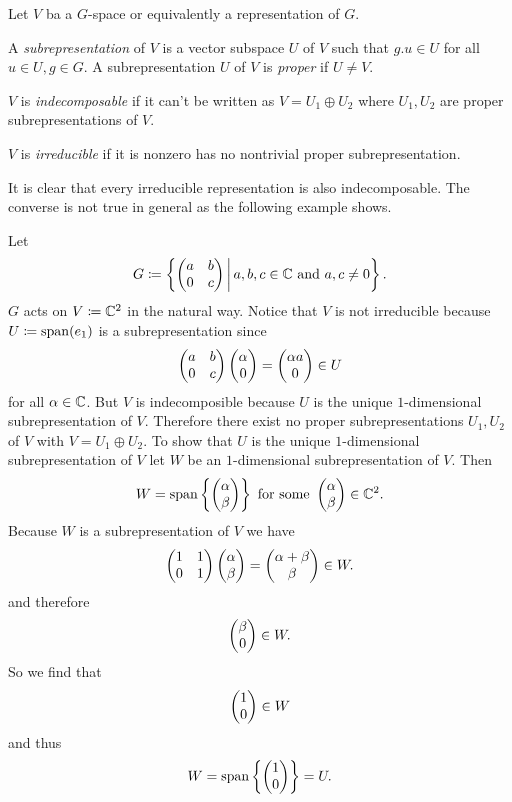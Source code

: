 \begin{defi}
    Let $V$ ba a $G$-space or equivalently a representation of $G$.

    A \emph{subrepresentation} of $V$ is a vector subspace $U$ of $V$ such that $g.u \in U$ for all $u \in U, g \in G$.
    A subrepresentation $U$ of $V$ is \emph{proper} if $U \neq V$.
    
    $V$ is \emph{indecomposable} if it can’t be written as $V = U_1 \oplus U_2$ where $U_1, U_2$ are proper subrepresentations of $V$.
    
    $V$ is \emph{irreducible} if it is nonzero has no nontrivial proper subrepresentation.
\end{defi}

It is clear that every irreducible representation is also indecomposable.
The converse is not true in general as the following example shows.

\begin{expl}
  Let
  \[
              G
    \coloneqq \left\{
                \begin{pmatrix}
                  a & b \\
                  0 & c
                \end{pmatrix}
              \,\middle|\,
                a, b, c \in \mathbb{C}
                \text{ and }
                a, c \neq 0
              \right\}.
  \]
  $G$ acts on $V \coloneqq \mathbb{C}^2$ in the natural way.
  Notice that $V$ is not irreducible because $U \coloneqq \operatorname{span}(e_1)$ is a subrepresentation since
  \[
        \begin{pmatrix}
          a & b \\
          0 & c 
        \end{pmatrix}
        \begin{pmatrix}\alpha \\ 0\end{pmatrix}
    =   \begin{pmatrix}\alpha a \\ 0\end{pmatrix}
    \in U
  \]
  for all $\alpha \in \mathbb{C}$.
  But $V$ is indecomposible because $U$ is the unique $1$-dimensional subrepresentation of $V$.
  Therefore there exist no proper subrepresentations $U_1, U_2$ of $V$ with $V = U_1 \oplus U_2$.
  To show that $U$ is the unique $1$-dimensional subrepresentation of $V$ let $W$ be an $1$-dimensional subrepresentation of $V$.
  Then
  \[
      W
    = \operatorname{span}\left\{
              \begin{pmatrix}\alpha \\ \beta\end{pmatrix}
            \right\}
    \text{ for some }
        \begin{pmatrix}\alpha \\ \beta\end{pmatrix}
    \in \mathbb{C}^2.
  \]
  Because $W$ is a subrepresentation of $V$ we have
  \[
        \begin{pmatrix}
          1 & 1 \\
          0 & 1
        \end{pmatrix}
        \begin{pmatrix}\alpha \\ \beta\end{pmatrix}
    =   \begin{pmatrix}\alpha + \beta \\ \beta\end{pmatrix}
    \in W.
  \]
  and therefore
  \[
    \begin{pmatrix}\beta \\ 0\end{pmatrix} \in W.
  \]
  So we find that
  \[
    \begin{pmatrix}1 \\ 0\end{pmatrix} \in W
  \]
  and thus
  \[
      W
    = \operatorname{span} \left\{ \begin{pmatrix}1 \\ 0\end{pmatrix} \right\}
    = U.
  \]
\end{expl}


